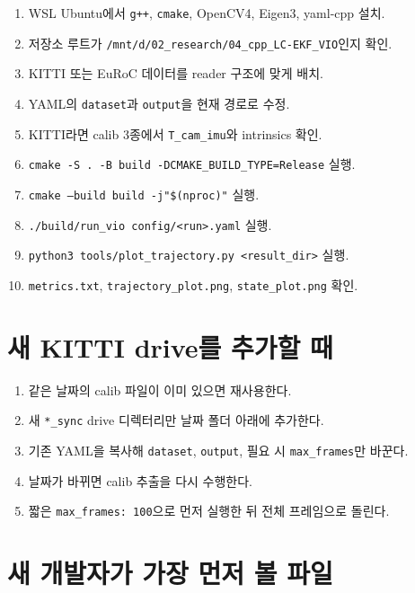 \documentclass[11pt,a4paper,oneside]{report}
\begin{document}
\begin{checkbox}
\begin{enumerate}[leftmargin=1.5em]
\item WSL Ubuntu에서 \texttt{g++}, \texttt{cmake}, OpenCV4, Eigen3, yaml-cpp 설치.
\item 저장소 루트가 \texttt{/mnt/d/02\_research/04\_cpp\_LC-EKF\_VIO}인지 확인.
\item KITTI 또는 EuRoC 데이터를 reader 구조에 맞게 배치.
\item YAML의 \texttt{dataset}과 \texttt{output}을 현재 경로로 수정.
\item KITTI라면 calib 3종에서 \texttt{T\_cam\_imu}와 intrinsics 확인.
\item \texttt{cmake -S . -B build -DCMAKE\_BUILD\_TYPE=Release} 실행.
\item \texttt{cmake --build build -j"\$(nproc)"} 실행.
\item \texttt{./build/run\_vio config/<run>.yaml} 실행.
\item \texttt{python3 tools/plot\_trajectory.py <result\_dir>} 실행.
\item \texttt{metrics.txt}, \texttt{trajectory\_plot.png}, \texttt{state\_plot.png} 확인.
\end{enumerate}
\end{checkbox}

\section{새 KITTI drive를 추가할 때}

\begin{enumerate}[leftmargin=1.5em]
\item 같은 날짜의 calib 파일이 이미 있으면 재사용한다.
\item 새 \texttt{*\_sync} drive 디렉터리만 날짜 폴더 아래에 추가한다.
\item 기존 YAML을 복사해 \texttt{dataset}, \texttt{output}, 필요 시 \texttt{max\_frames}만 바꾼다.
\item 날짜가 바뀌면 calib 추출을 다시 수행한다.
\item 짧은 \texttt{max\_frames: 100}으로 먼저 실행한 뒤 전체 프레임으로 돌린다.
\end{enumerate}

\section{새 개발자가 가장 먼저 볼 파일}
\end{document}
